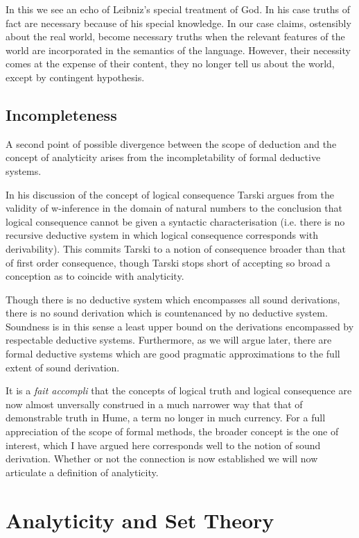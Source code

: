\documentclass{rbjk}
\begin{document}
\begin{article}
In this we see an echo of Leibniz's special treatment of God.
In his case truths of fact are necessary because of his special knowledge.
In our case claims, ostensibly about the real world, become necessary truths when the relevant features of the world are incorporated in the semantics of the language.
However, their necessity comes at the expense of their content, they no longer tell us about the world, except by contingent hypothesis.

\subsection{Incompleteness}

A second point of possible divergence between the scope of deduction and the concept of analyticity arises from the incompletability of formal deductive systems.

In his discussion of the concept of logical consequence \cite{Tarski36} Tarski argues from the validity of w-inference in the domain of natural numbers to the conclusion that logical consequence cannot be given a syntactic characterisation (i.e. there is no recursive deductive system in which logical consequence corresponds with derivability).
This commits Tarski to a notion of consequence broader than that of first order consequence, though Tarski stops short of accepting so broad a conception as to coincide with analyticity.

Though there is no deductive system which encompasses all sound derivations, there is no sound derivation which is countenanced by no deductive system.
Soundness is in this sense a least upper bound on the derivations encompassed by respectable deductive systems.
Furthermore, as we will argue later, there are formal deductive systems which are good pragmatic approximations to the full extent of sound derivation.

It is a {\it fait accompli} that the concepts of logical truth and logical consequence are now almost unversally construed in a much narrower way that that of demonstrable truth in Hume, a term no longer in much currency.
For a full appreciation of the scope of formal methods, the broader concept is the one of interest, which I have argued here corresponds well to the notion of sound derivation.
Whether or not the connection is now established we will now articulate a definition of analyticity.

\section{Analyticity and Set Theory}


\end{article}
\end{document}
